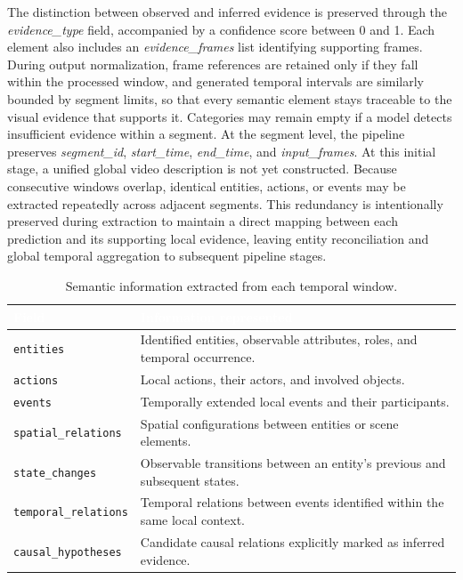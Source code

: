 The distinction between observed and inferred evidence is preserved through the \textit{evidence\_type} field, accompanied by a confidence score between 0 and 1. Each element also includes an \textit{evidence\_frames} list identifying supporting frames. During output normalization, frame references are retained only if they fall within the processed window, and generated temporal intervals are similarly bounded by segment limits, so that every semantic element stays traceable to the visual evidence that supports it.
Categories may remain empty if a model detects insufficient evidence within a segment. At the segment level, the pipeline preserves \textit{segment\_id}, \textit{start\_time}, \textit{end\_time}, and \textit{input\_frames}.
At this initial stage, a unified global video description is not yet constructed. Because consecutive windows overlap, identical entities, actions, or events may be extracted repeatedly across adjacent segments. This redundancy is intentionally preserved during extraction to maintain a direct mapping between each prediction and its supporting local evidence, leaving entity reconciliation and global temporal aggregation to subsequent pipeline stages.
\begin{table}[H]
\centering
\small
\renewcommand{\arraystretch}{0.9}
\begin{tabularx}{\textwidth}{|l|X|}
    \hline
    \rowcolor{EcoForestGreen}
    \textcolor{white}{\textbf{Field}} &
    \textcolor{white}{\textbf{Information represented}} \\
    \hline
    \texttt{entities} &
    Identified entities, observable attributes, roles, and temporal occurrence. \\
    \hline
    \texttt{actions} &
    Local actions, their actors, and involved objects. \\
    \hline
    \texttt{events} &
    Temporally extended local events and their participants. \\
    \hline
    \texttt{spatial\_relations} &
    Spatial configurations between entities or scene elements. \\
    \hline
    \texttt{state\_changes} &
    Observable transitions between an entity's previous and subsequent states. \\
    \hline
    \texttt{temporal\_relations} &
    Temporal relations between events identified within the same local context. \\
    \hline
    \texttt{causal\_hypotheses} &
    Candidate causal relations explicitly marked as inferred evidence. \\
    \hline
\end{tabularx}
\caption{Semantic information extracted from each temporal window.}
\label{tab:semantic_representation}
\end{table}
